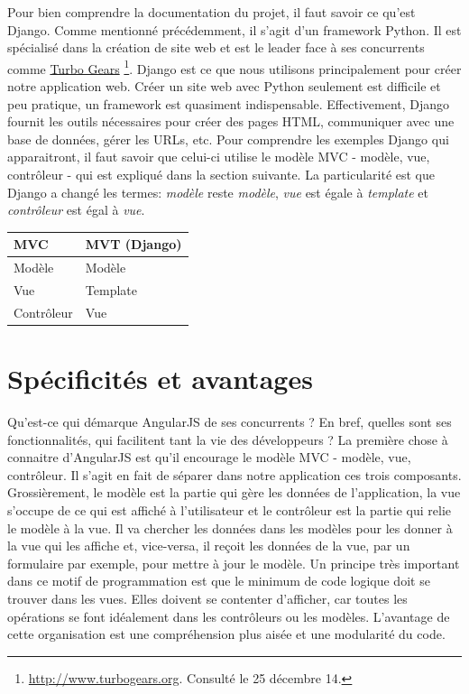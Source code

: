 \documentclass[a4paper,10pt,twoside]{sphinxmanual}
\begin{document}
Pour bien comprendre la documentation du projet, il faut savoir ce qu'est Django. Comme mentionné précédemment, il s'agit d'un framework Python. Il est spécialisé dans la création de site web et est le leader face à ses concurrents comme \href{http://www.turbogears.org/}{Turbo Gears} \footnote{
\href{http://www.turbogears.org}{http://www.turbogears.org}. Consulté le 25 décembre 14.
}. Django est ce que nous utilisons principalement pour créer notre application web. Créer un site web avec Python seulement est difficile et peu pratique, un framework est  quasiment indispensable. Effectivement, Django fournit les outils nécessaires pour créer des pages HTML, communiquer avec une base de données, gérer les URLs, etc. Pour comprendre les exemples Django qui apparaitront, il faut savoir que celui-ci utilise le modèle MVC - modèle, vue, contrôleur - qui est expliqué dans la section suivante. La particularité est que Django a changé les termes: \emph{modèle} reste \emph{modèle}, \emph{vue} est égale à \emph{template} et \emph{contrôleur} est égal à \emph{vue}.

\begin{tabulary}{\linewidth}{|L|L|}
\hline
\textsf{\relax 
MVC
} & \textsf{\relax 
MVT (Django)
}\\
\hline
Modèle
 & 
Modèle
\\

Vue
 & 
Template
\\

Contrôleur
 & 
Vue
\\
\hline\end{tabulary}



\section{Spécificités et avantages}
\label{angularjs:specificites-et-avantages}
Qu'est-ce qui démarque AngularJS de ses concurrents ? En bref, quelles sont ses fonctionnalités, qui facilitent tant la vie des développeurs ? La première chose à connaitre d'AngularJS est qu'il encourage le modèle MVC - modèle, vue, contrôleur. Il s'agit en fait de séparer dans notre application ces trois composants. Grossièrement, le modèle est la partie qui gère les données de l'application, la vue s'occupe de ce qui est affiché à l'utilisateur et le contrôleur est la partie qui relie le modèle à la vue. Il va chercher les données dans les modèles pour les donner à la vue qui les affiche et, vice-versa, il reçoit les données de la vue, par un formulaire par exemple, pour mettre à jour le modèle. Un principe très important dans ce motif de programmation est que le minimum de code logique doit se trouver dans les vues. Elles doivent se contenter d'afficher, car toutes les opérations se font idéalement dans les contrôleurs ou les modèles. L'avantage de cette organisation est une compréhension plus aisée et une modularité du code.
\end{document}
